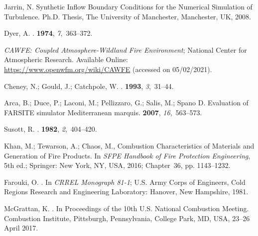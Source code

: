 \documentclass[atmosphere,article,accept,moreauthors,pdftex]{Definitions/mdpi}
\begin{document}
\begin{thebibliography}{999}
Jarrin, N.
\newblock Synthetic Inflow Boundary Conditions for the Numerical Simulation of
  Turbulence.
\newblock Ph.D. Thesis, The University of Manchester, Manchester, UK,  2008.

Dyer, A.
.
 {\bf 1974}, {\em 7},~363--372.

{\em CAWFE: Coupled Atmosphere-Wildland Fire Environment};
\newblock National Center for Atmospheric Research. Available Online: \url{https://www.openwfm.org/wiki/CAWFE}  (accessed on 05/02/2021).%

Cheney, N.; Gould, J.; Catchpole, W.
.
 {\bf 1993}, {\em
  3},~31--44.

Arca, B.; Duce, P.; Laconi, M.; Pellizzaro, G.; Salis, M.; Spano D.
\newblock Evaluation of FARSITE simulator Mediterranean marquis.
 {\bf 2007}, {\em
  16},~563--573.

Susott, R.
.
 {\bf 1982}, {\em 2},~404--420.

Khan, M.; Tewarson, A.; Chaos, M., {Combustion Characteristics of Materials and
  Generation of Fire Products}.
\newblock In {\em SFPE Handbook of Fire Protection Engineering}, 5th ed.;
  Springer: New York, NY, USA,  2016; Chapter~36, pp. 1143--1232.

Farouki, O.
.
\newblock In \emph{CRREL Monograph 81-1}; U.S. Army Corps of Engineers, Cold Regions
  Research and Engineering Laboratory: Hanover, New Hampshire,  1981.
  
McGrattan, K.
.
\newblock  In Proceedings of the 10th U.S. National Combustion Meeting. Combustion
  Institute, Pittsburgh, Pennsylvania,  College Park, MD, USA,  23--26 April 2017.




\end{thebibliography}
\end{document}
